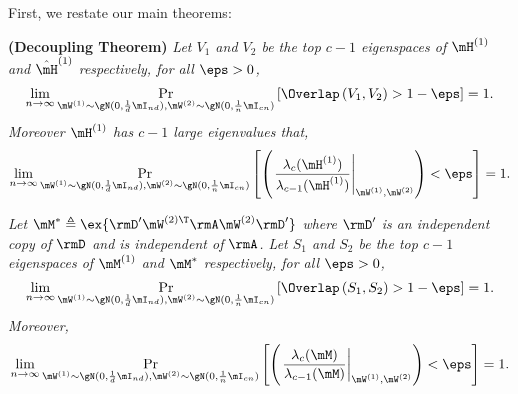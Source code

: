 First, we restate our main theorems:

\noindent\textbf{ (Decoupling Theorem)}
\emph{
Let $V_1$ and $V_2$ be the top $c-1$ eigenspaces of $\mH^{(1)}$ and $\hat\mH^{(1)}$ respectively, for all $\eps>0$, 
\begin{equation}
    \lim_{n\to\infty}\mathop{\Pr}_{\mW^{(1)}\sim\gN(0,\frac{1}{d}\mI_{nd}), \mW^{(2)}\sim\gN(0,\frac{1}{n}\mI_{cn})}\left[\Overlap\left(V_1,V_2\right)>1-\eps\right] = 1.
\end{equation}
Moreover $\mH^{(1)}$ has $c-1$ large eigenvalues that, \begin{equation}
    \lim_{n\to\infty}\mathop{\Pr}_{\mW^{(1)}\sim\gN(0,\frac{1}{d}\mI_{nd}), \mW^{(2)}\sim\gN(0,\frac{1}{n}\mI_{cn})}\left[\left(\left.\frac{\lambda_c(\mH^{(1)})}{\lambda_{c-1}(\mH^{(1)})}\right|_{\mW^{(1)}, \mW^{(2)}}\right) < \eps\right] = 1.
\end{equation}}

\noindent\textbf{ }
\emph{
Let $\mM^*\triangleq \ex{\rmD'\mW^{(2)\T}\rmA\mW^{(2)}\rmD'}$ where $\rmD'$ is an independent copy of $\rmD$ and is independent of $\rmA$. Let $S_1$ and $S_2$ be the top $c-1$ eigenspaces of $\mM^{(1)}$ and $\mM^*$ respectively, for all $\eps>0$,
\begin{equation}
    \lim_{n\to\infty}\mathop{\Pr}_{\mW^{(1)}\sim\gN(0,\frac{1}{d}\mI_{nd}), \mW^{(2)}\sim\gN(0,\frac{1}{n}\mI_{cn})}\left[\Overlap\left(S_1,S_2\right)>1-\eps\right] = 1.
\end{equation}
Moreover,  \begin{equation}
    \lim_{n\to\infty}\mathop{\Pr}_{\mW^{(1)}\sim\gN(0,\frac{1}{d}\mI_{nd}), \mW^{(2)}\sim\gN(0,\frac{1}{n}\mI_{cn})}\left[\left(\left.\frac{\lambda_c(\mM)}{\lambda_{c-1}(\mM)}\right|_{\mW^{(1)}, \mW^{(2)}}\right) < \eps\right] = 1.
\end{equation}
}
